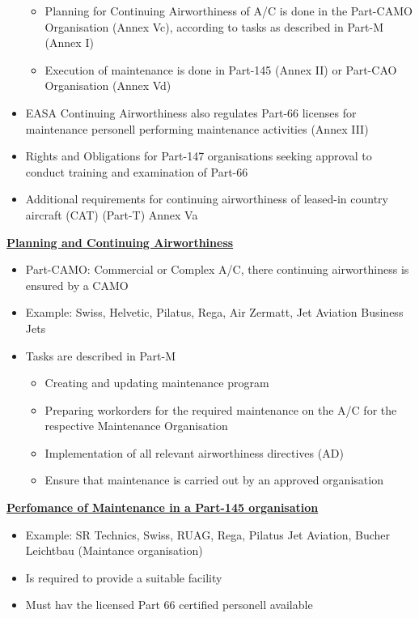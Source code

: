 \documentclass[9pt, landscape, fleqn]{scrartcl}
\begin{document}
\begin{multicols*}{3}
\begin{itemize}
    \begin{itemize}
        \item Planning for Continuing Airworthiness of A/C is done in the Part-CAMO Organisation (Annex Vc), according to tasks as described in Part-M (Annex I)
        \item Execution of maintenance is done in Part-145 (Annex II) or Part-CAO Organisation (Annex Vd)
    \end{itemize}
    \item EASA Continuing Airworthiness also regulates Part-66 licenses for maintenance personell performing maintenance activities (Annex III)
    \item Rights and Obligations for Part-147 organisations seeking approval to conduct training and examination of Part-66 
    \item Additional requirements for continuing airworthiness of leased-in country aircraft (CAT) (Part-T) Annex Va
\end{itemize}
\underline{\textbf{Planning and Continuing Airworthiness}}
\begin{itemize}
    \item Part-CAMO: Commercial or Complex A/C, there continuing airworthiness is ensured by a CAMO 
    \item Example: Swiss, Helvetic, Pilatus, Rega, Air Zermatt, Jet Aviation Business Jets 
    \item Tasks are described in Part-M
    \begin{itemize}
        \item Creating and updating maintenance program 
        \item Preparing workorders for the required maintenance on the A/C for the respective Maintenance Organisation 
        \item Implementation of all relevant airworthiness directives (AD)
        \item Ensure that maintenance is carried out by an approved organisation
    \end{itemize}
\end{itemize}
\underline{\textbf{Perfomance of Maintenance in a Part-145 organisation}}
\begin{itemize}
    \item Example: SR Technics, Swiss, RUAG, Rega, Pilatus Jet Aviation, Bucher Leichtbau (Maintance organisation)
    \item Is required to provide a suitable facility
    \item Must hav the licensed Part 66 certified personell available

\end{itemize}
\end{multicols*}
\end{document}
